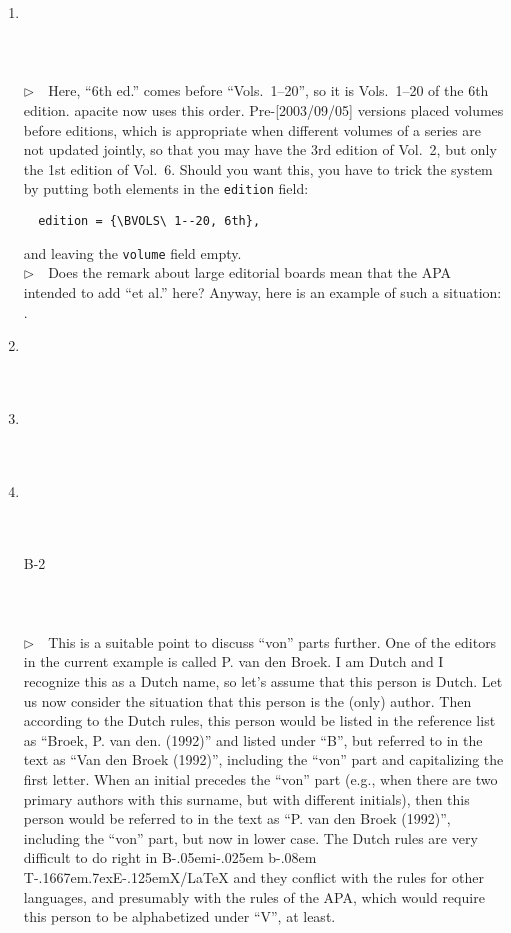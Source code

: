 \documentclass{article}
\def\BibTeX{{\rm B\kern-.05em{\sc i\kern-.025em b}\kern-.08em
    T\kern-.1667em\lower.7ex\hbox{E}\kern-.125emX}}%
\newcommand{\EM}{\ensuremath{\triangleright\quad}}
\newcommand{\pkg}[1]{\textsf{#1}}%
\newcommand{\fieldname}[1]{\texttt{#1}}%
\begin{document}
\begin{enumerate}
\item \cite{ex30} \\ \cite{ex30}\\ \\ \\
      \EM Here, ``6th ed.'' comes before ``Vols.\ 1--20'', so it is
      Vols.\ 1--20 of the 6th edition. \pkg{apacite} now uses this
      order. Pre-[2003/09/05] versions placed volumes before editions,
      which is appropriate when different volumes of a series
      are not updated jointly, so that you may have the 3rd edition
      of Vol.~2, but only the 1st edition of Vol.~6. Should you
      want this, you have to trick the system by putting both
      elements in the \fieldname{edition} field:
\begin{verbatim}
  edition = {\BVOLS\ 1--20, 6th},
\end{verbatim}
      and leaving the \fieldname{volume} field empty.\\
      \EM Does the remark about large editorial boards mean that the
      APA intended to add ``et al.'' here? Anyway, here is an example
      of such a situation: .
\item \cite{ex31} \\ \cite{ex31}\\ \\ 
\item \cite{ex32} \\ \cite{ex32}\\ \\ 
\item \cite{ex33} \\ \cite{ex33}\\ \\ 
\item[B-2] \cite{B-2} \\ \cite{B-2} \\  \\  \\
      \EM This is a suitable point to discuss ``von'' parts further.
      One of the editors in the current example is called
      P. van den Broek. I am Dutch and I recognize this as a Dutch
      name, so let's assume that this person is Dutch. Let us now
      consider the situation that this person is the (only) author.
      Then according to the Dutch rules, this person would be listed in the
      reference list as ``Broek, P. van den. (1992)'' and listed under ``B'',
      but referred to in the text as ``Van den Broek (1992)'', including
      the ``von'' part and capitalizing the first letter. When an
      initial precedes the ``von'' part (e.g., when there are two
      primary authors with this surname, but with different initials),
      then this person would be referred to in the text as
      ``P. van den Broek (1992)'', including the ``von'' part, but now
      in lower case. The Dutch rules are very difficult to do right in
      \BibTeX{}/\LaTeX{} and they conflict with the rules for other
      languages, and presumably with the rules of the APA, which would
      require this person to be alphabetized under ``V'', at least.


\end{enumerate}
\end{document}
